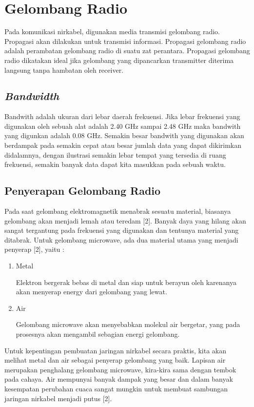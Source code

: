 \documentclass[12pt,a4paper,oneside,titlepage]{report}
\begin{document}
		\section{Gelombang Radio}
		Pada komunikasi nirkabel, digunakan media transmisi gelombang radio. Propagasi akan dilakukan untuk transmisi informasi. Propagasi gelombang radio adalah perambatan gelombang radio di suatu zat perantara. Propagasi gelombang radio dikatakan ideal jika gelombang yang dipancarkan transmitter diterima langsung tanpa hambatan oleh receiver.
		\subsection{\emph{Bandwidth}}
		Bandwith adalah ukuran dari lebar daerah frekuensi. Jika lebar frekuensi yang digunakan oleh sebuah alat adalah 2.40 GHz sampai 2.48 GHz maka bandwith yang digunkan adalah 0.08 GHz. Semakin besar bandwith yang digunakan akan berdampak pada semakin cepat atau besar jumlah data yang dapat dikirimkan didalamnya, dengan ilustrasi semakin lebar tempat yang tersedia di ruang frekuensi, semakin banyak data dapat kita masukkan pada sebuah waktu.\cite{Hartono2011}
		\subsection{Penyerapan Gelombang Radio}
		Pada saat gelombang elektromagnetik menabrak sesuatu material, biasanya gelombang akan menjadi lemah atau teredam [2]. Banyak daya yang hilang akan sangat tergantung pada frekuensi yang digunakan dan tentunya material yang ditabrak. Untuk gelombang microwave, ada dua material utama yang menjadi penyerap [2], yaitu :
		\begin{enumerate}
			\item Metal
			
			Elektron bergerak bebas di metal dan siap untuk berayun oleh karenanya akan menyerap energy dari gelombang yang lewat.
			
			\item Air
			
			Gelombang microwave akan menyebabkan molekul air bergetar, yang pada prosesnya akan mengambil sebagian energi gelombang.
		\end{enumerate}
		Untuk kepentingan pembuatan jaringan nirkabel secara praktis, kita akan melihat metal dan air sebagai penyerap gelombang yang baik. Lapisan air merupakan penghalang gelombang microwave, kira-kira sama dengan tembok pada cahaya. Air mempunyai banyak dampak yang besar dan dalam banyak kesempatan perubahan cuaca sangat mungkin untuk membuat sambungan jaringan nirkabel menjadi putus [2].
		
\end{document}
